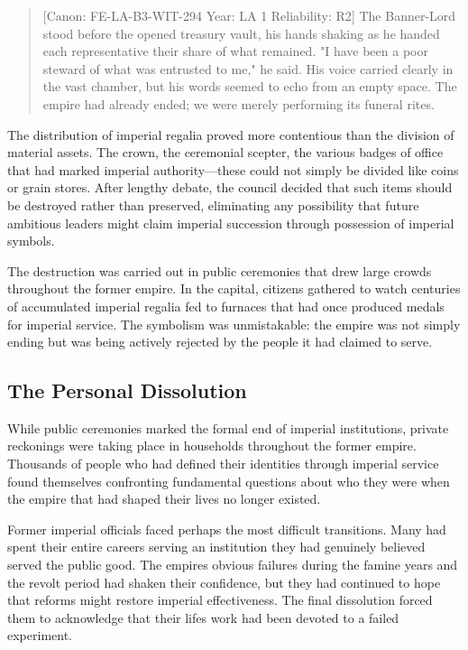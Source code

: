 \begin{quote}
{[}Canon: FE-LA-B3-WIT-294 \textbar{} Year: LA 1 \textbar{} Reliability:
R2{]} The Banner-Lord stood before the opened treasury vault, his hands
shaking as he handed each representative their share of what remained.
"I have been a poor steward of what was entrusted to me," he said. His
voice carried clearly in the vast chamber, but his words seemed to echo
from an empty space. The empire had already ended; we were merely
performing its funeral rites.
\end{quote}

The distribution of imperial regalia proved more contentious than the
division of material assets. The crown, the ceremonial scepter, the
various badges of office that had marked imperial authority---these
could not simply be divided like coins or grain stores. After lengthy
debate, the council decided that such items should be destroyed rather
than preserved, eliminating any possibility that future ambitious
leaders might claim imperial succession through possession of imperial
symbols.

The destruction was carried out in public ceremonies that drew large
crowds throughout the former empire. In the capital, citizens gathered
to watch centuries of accumulated imperial regalia fed to furnaces that
had once produced medals for imperial service. The symbolism was
unmistakable: the empire was not simply ending but was being actively
rejected by the people it had claimed to serve.

\subsection{The Personal Dissolution}\label{the-personal-dissolution}

While public ceremonies marked the formal end of imperial institutions,
private reckonings were taking place in households throughout the former
empire. Thousands of people who had defined their identities through
imperial service found themselves confronting fundamental questions
about who they were when the empire that had shaped their lives no
longer existed.

Former imperial officials faced perhaps the most difficult transitions.
Many had spent their entire careers serving an institution they had
genuinely believed served the public good. The empire\textquotesingle s
obvious failures during the famine years and the revolt period had
shaken their confidence, but they had continued to hope that reforms
might restore imperial effectiveness. The final dissolution forced them
to acknowledge that their life\textquotesingle s work had been devoted
to a failed experiment.

